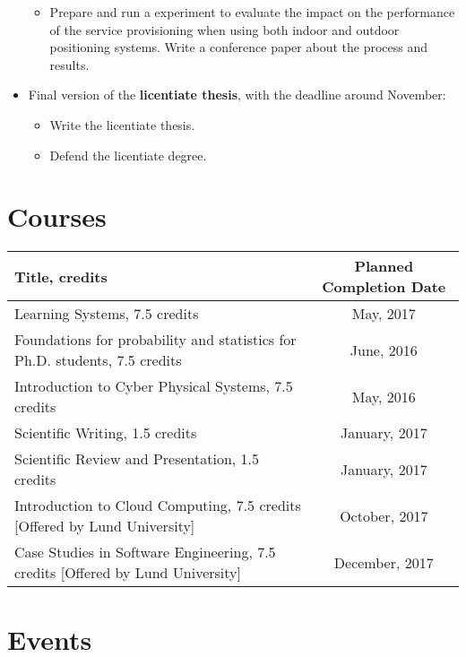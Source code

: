 \documentclass[]{article}
\begin{document}
\begin{itemize}
\begin{itemize}
			\item Prepare and run a experiment to evaluate the impact on the performance of the service provisioning when using both indoor and outdoor positioning systems. Write a conference paper about the process and results.
		\end{itemize}
	\item Final version of the \textbf{licentiate thesis}, with the deadline around November:
		\begin{itemize}		
			\item Write the licentiate thesis.
			\item Defend the licentiate degree.
		\end{itemize}
\end{itemize}

\section*{Courses}

\begin{center}
	\label{courses}
	\begin{tabular}{|p{7.5cm}|c|} 	 
		\hline	
		\textbf{Title, credits} & \textbf{Planned Completion Date} \\ \hline	
		Learning Systems, 7.5 credits & May, 2017 \\ \hline	
		Foundations for probability and statistics for Ph.D. students, 7.5 credits & June, 2016 \\ \hline	
		Introduction to Cyber Physical Systems, 7.5 credits & May, 2016 \\ \hline	
		Scientific Writing, 1.5 credits & January, 2017 \\ \hline	
		Scientific Review and Presentation, 1.5 credits & January, 2017 \\ \hline
		Introduction to Cloud Computing, 7.5 credits [Offered by Lund University] & October, 2017 \\ \hline	
		Case Studies in Software Engineering, 7.5 credits [Offered by Lund University] & December, 2017 \\ \hline			 		 
	\end{tabular}
\end{center}

\section*{Events}
\end{document}

